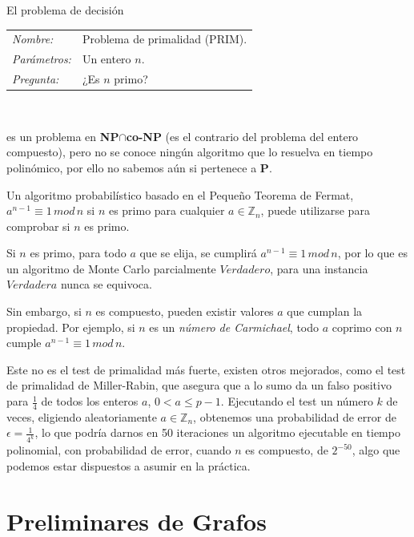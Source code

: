 \begin{example}
	El problema de decisión
	
	\begin{tabular}{|ll}
		\textit{Nombre:} & Problema de primalidad (PRIM). \\
		\textit{Parámetros:} & Un entero $n$. \\
		\textit{Pregunta:} & ¿Es $n$ primo? \\
	\end{tabular}
	\\
	\hfil
	
	es un problema en \textbf{NP}$\cap$\textbf{co-NP} (es el contrario del problema del entero compuesto), pero no se conoce ningún algoritmo que lo resuelva en tiempo polinómico, por ello no sabemos aún si pertenece a \textbf{P}.
	
	Un algoritmo probabilístico basado en el Pequeño Teorema de Fermat, $a^{n-1} \equiv 1 \, mod \, n$ si $n$ es primo para cualquier $a\in \mathbb{Z}_n$, puede utilizarse para comprobar si $n$ es primo.
	
	Si $n$ es primo, para todo $a$ que se elija, se cumplirá $a^{n-1} \equiv 1 \, mod \, n$, por lo que es un algoritmo de Monte Carlo parcialmente $Verdadero$, para una instancia $Verdadera$ nunca se equivoca.
	
	Sin embargo, si $n$ es compuesto, pueden existir valores $a$ que cumplan la propiedad. Por ejemplo, si $n$ es un \textit{número de Carmichael}, todo $a$ coprimo con $n$ cumple $a^{n-1} \equiv 1 \, mod \, n$.
	
	Este no es el test de primalidad más fuerte, existen otros mejorados, como el test de primalidad de Miller-Rabin, que asegura que a lo sumo da un falso positivo para $\frac{1}{4}$ de todos los enteros $a$, $0<a\leq p-1$. Ejecutando el test un número $k$ de veces, eligiendo aleatoriamente $a\in \mathbb{Z}_n$, obtenemos una probabilidad de error de $\epsilon=\frac{1}{4^k}$, lo que podría darnos en 50 iteraciones un algoritmo ejecutable en tiempo polinomial, con probabilidad de error, cuando $n$ es compuesto, de $2^{-50}$, algo que podemos estar dispuestos a asumir en la práctica.
	
\end{example}






%
%
%
%
%
%

\hfil


\section{Preliminares de Grafos}

